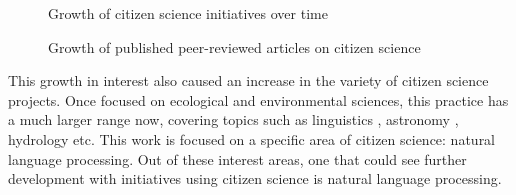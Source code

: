 \begin{figure}[!h]
    \centering
    \caption{Growth of citizen science initiatives over time}
    \label{fig:growth-citizen-science-projects}
\end{figure}

\begin{figure}[!h]
    \centering
    \caption{Growth of published peer-reviewed articles on citizen science}
    \label{fig:growth-publications}
\end{figure}

This growth in interest also caused an increase in the variety of citizen science projects. Once focused on ecological and environmental sciences, this practice has a much larger range now, covering topics such as linguistics \cite{svendsen2018dynamics}, astronomy \cite{marshall2015ideas}, hydrology \cite{buytaert2014citizen} etc. This work is focused on a specific area of citizen science: natural language processing.
Out of these interest areas, one that could see further development with initiatives using citizen science is natural language processing.

